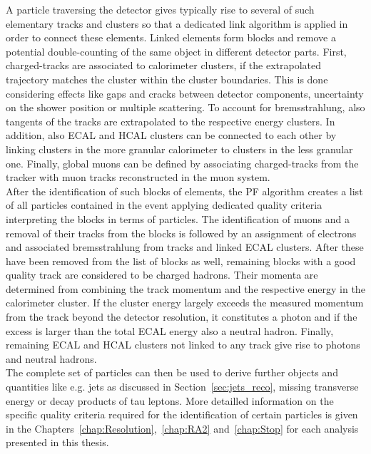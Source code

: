A particle traversing the detector gives typically rise to several of such elementary tracks and clusters so that a dedicated link algorithm is applied in order to connect these elements. Linked elements form blocks and remove a potential double-counting of the same object in different detector parts. First, charged-tracks are associated to calorimeter clusters, if the extrapolated trajectory matches the cluster within the cluster boundaries. This is done considering effects like gaps and cracks between detector components, uncertainty on the shower position or multiple scattering. To account for bremsstrahlung, also tangents of the tracks are extrapolated to the respective energy clusters. In addition, also ECAL and HCAL clusters can be connected to each other by linking clusters in the more granular calorimeter to clusters in the less granular one. Finally, global muons can be defined by associating charged-tracks from the tracker with muon tracks reconstructed in the muon system. \\
After the identification of such blocks of elements, the PF algorithm creates a list of all particles contained in the event applying dedicated quality criteria interpreting the blocks in terms of particles. The identification of muons and a removal of their tracks from the blocks is followed by an assignment of electrons and associated bremsstrahlung from tracks and linked ECAL clusters. After these have been removed from the list of blocks as well, remaining blocks with a good quality track are considered to be charged hadrons. Their momenta are determined from combining the track momentum and the respective energy in the calorimeter cluster. If the cluster energy largely exceeds the measured momentum from the track beyond the detector resolution, it constitutes a photon and if the excess is larger than the total ECAL energy also a neutral hadron. Finally, remaining ECAL and HCAL clusters not linked to any track give rise to photons and neutral hadrons. \\
The complete set of particles can then be used to derive further objects and quantities like e.g. jets as discussed in Section~\ref{sec:jets_reco}, missing transverse energy \met or decay products of tau leptons. More detailled information on the specific quality criteria required for the identification of certain particles is given in the Chapters~\ref{chap:Resolution},~\ref{chap:RA2} and~\ref{chap:Stop} for each analysis presented in this thesis.

